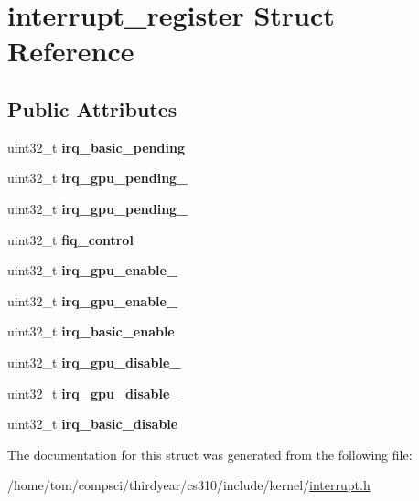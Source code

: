\hypertarget{structinterrupt__register}{}\section{interrupt\+\_\+register Struct Reference}
\label{structinterrupt__register}
\subsection*{Public Attributes}
\begin{DoxyCompactItemize}
\item 
\mbox{\label{structinterrupt__register_aeff496841aff15ebbe829f4f0c9ea792}} 
uint32\+\_\+t {\bfseries irq\+\_\+basic\+\_\+pending}
\item 
\mbox{\label{structinterrupt__register_afc8a477083721eda10dd9d640921991d}} 
uint32\+\_\+t {\bfseries irq\+\_\+gpu\+\_\+pending\+\_}
\item 
\mbox{\label{structinterrupt__register_a8b669fc54c0239e81f64be9c6ad84389}} 
uint32\+\_\+t {\bfseries irq\+\_\+gpu\+\_\+pending\+\_}
\item 
\mbox{\label{structinterrupt__register_a926de3f38d05336ee8e41b446262c720}} 
uint32\+\_\+t {\bfseries fiq\+\_\+control}
\item 
\mbox{\label{structinterrupt__register_a28740928b17d6b5d34d246b0f4f971a4}} 
uint32\+\_\+t {\bfseries irq\+\_\+gpu\+\_\+enable\+\_}
\item 
\mbox{\label{structinterrupt__register_a3e7cddbedceb60ac544ca0c7a5195cd7}} 
uint32\+\_\+t {\bfseries irq\+\_\+gpu\+\_\+enable\+\_}
\item 
\mbox{\label{structinterrupt__register_a0b93a6a88c2b763680e855774529c9c2}} 
uint32\+\_\+t {\bfseries irq\+\_\+basic\+\_\+enable}
\item 
\mbox{\label{structinterrupt__register_a32a0a60fb5fe1956de88ef22705065c9}} 
uint32\+\_\+t {\bfseries irq\+\_\+gpu\+\_\+disable\+\_}
\item 
\mbox{\label{structinterrupt__register_ae2abf52fa4068f7aca49fb2a56a329c5}} 
uint32\+\_\+t {\bfseries irq\+\_\+gpu\+\_\+disable\+\_}
\item 
\mbox{\label{structinterrupt__register_ad17822368a6094ff32a1e0e9b9938022}} 
uint32\+\_\+t {\bfseries irq\+\_\+basic\+\_\+disable}
\end{DoxyCompactItemize}


The documentation for this struct was generated from the following file\+:\begin{DoxyCompactItemize}
\item 
/home/tom/compsci/thirdyear/cs310/include/kernel/\mbox{\hyperlink{interrupt_8h}{interrupt.\+h}}\end{DoxyCompactItemize}
